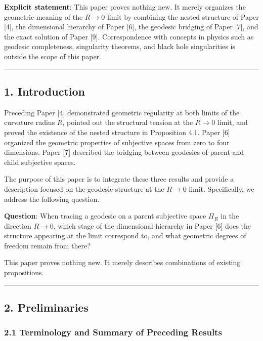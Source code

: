 \documentclass[a4paper,11pt]{article}
\theoremstyle{definition}
\begin{document}
\textbf{Explicit statement}: This paper proves nothing new. It merely
organizes the geometric meaning of the \(R \to 0\) limit by combining
the nested structure of Paper {[}4{]}, the dimensional hierarchy of
Paper {[}6{]}, the geodesic bridging of Paper {[}7{]}, and the exact
solution of Paper {[}9{]}. Correspondence with concepts in physics such
as geodesic completeness, singularity theorems, and black hole
singularities is outside the scope of this paper.

\begin{center}\rule{0.5\linewidth}{0.5pt}\end{center}

\subsection{1. Introduction}\label{introduction}

Preceding Paper {[}4{]} demonstrated geometric regularity at both limits
of the curvature radius \(R\), pointed out the structural tension at the
\(R \to 0\) limit, and proved the existence of the nested structure in
Proposition 4.1. Paper {[}6{]} organized the geometric properties of
subjective spaces from zero to four dimensions. Paper {[}7{]} described
the bridging between geodesics of parent and child subjective spaces.

The purpose of this paper is to integrate these three results and
provide a description focused on the geodesic structure at the
\(R \to 0\) limit. Specifically, we address the following question.

\textbf{Question}: When tracing a geodesic on a parent subjective space
\(\Pi_R\) in the direction \(R \to 0\), which stage of the dimensional
hierarchy in Paper {[}6{]} does the structure appearing at the limit
correspond to, and what geometric degrees of freedom remain from there?

This paper proves nothing new. It merely describes combinations of
existing propositions.

\begin{center}\rule{0.5\linewidth}{0.5pt}\end{center}

\subsection{2. Preliminaries}\label{preliminaries}

\subsubsection{2.1 Terminology and Summary of Preceding
Results}\label{terminology-and-summary-of-preceding-results}
\end{document}
